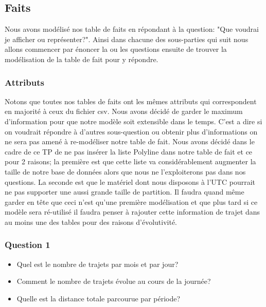 \documentclass[]{report}
\begin{document}
	\subsection{Faits}
	Nous avons modélisé nos table de faits en répondant à la question: "Que voudrai je afficher ou représenter?". Ainsi dans chacune des sous-parties qui suit nous allons commencer par énoncer la ou les  questions ensuite de trouver la modélisation de la table de fait pour y répondre. \\
	\subsubsection{Attributs}
	Notons que toutes nos tables de faits ont les mêmes attributs qui correspondent en majorité à ceux du fichier csv. Nous avons décidé de garder le maximum d'information pour que notre modèle soit extensible dans le temps. C'est a dire si on voudrait répondre à d'autres sous-question ou obtenir plus d'informations on ne sera pas amené à re-modéliser notre table de fait. Nous avons décidé dans le cadre de ce TP de ne pas insérer la liste Polyline dans notre table de fait et ce pour 2 raisons; la première est que cette liste va considérablement augmenter la taille de notre base de données alors que nous ne l'exploiterons pas dans nos questions. La seconde est que  le matériel dont nous disposons à l'UTC pourrait ne pas supporter une aussi grande taille de partition. Il faudra quand même  garder en tête que ceci n'est qu'une première modélisation et que plus tard si ce modèle sera ré-utilisé il faudra penser à rajouter cette information de trajet dans au moins une des tables pour des raisons d'évolutivité.
	\subsubsection{Question 1}
	\begin{itemize}
		\item Quel est le nombre de trajets par mois et par jour?
		\item Comment le nombre de trajets évolue au cours de la journée?
		\item Quelle est la distance totale parcourue par période?
	\end{itemize}
	
\end{document}
